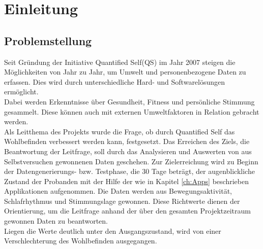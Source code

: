 
\chapter{Einleitung}
\label{ch:Einleitung}

\section{Problemstellung}
\label{ch:Einleitung:sec:Problemstellung}

Seit Gründung der Initiative Quantified Self(QS)\cite{web:QS} im Jahr 2007\cite{web:QSJahr} steigen die Möglichkeiten von Jahr zu Jahr, um Umwelt und personenbezogene Daten zu erfassen\cite{web:Tracking}. 
Dies wird durch unterschiedliche Hard- und Softwarelösungen ermöglicht. \\
Dabei werden Erkenntnisse über Gesundheit, Fitness und persönliche Stimmung gesammelt.
Diese können auch mit externen Umweltfaktoren in Relation gebracht werden. \\
Als Leitthema des Projekts wurde die Frage, ob durch Quantified Self das Wohlbefinden verbessert werden kann, festgesetzt. 
Das Erreichen des Ziels, die Beantwortung der Leitfrage, soll durch das Analysieren und Auswerten von aus Selbstversuchen gewonnenen Daten geschehen.
Zur Zielerreichung wird zu Beginn der Datengenerierungs- bzw. Testphase, die 30 Tage beträgt, der augenblickliche Zustand der Probanden mit der Hilfe der wie in Kapitel \ref{ch:Apps} beschrieben Applikationen aufgenommen. 
Die Daten werden aus Bewegungsaktivität, Schlafrhythmus und Stimmungslage gewonnen.
Diese Richtwerte dienen der Orientierung, um die Leitfrage anhand der über den gesamten Projektzeitraum gewonnen Daten zu beantworten. \\
Liegen die Werte deutlich unter den Ausgangszustand, wird von einer Verschlechterung des Wohlbefinden ausgegangen. \\
